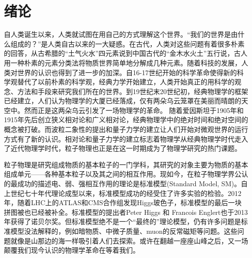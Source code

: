 

\setcounter{section}{0}



\chapter{绪论}

\setcounter{section}{0}

\setcounter{figure}{0}
\setcounter{table}{0}
\setcounter{equation}{0}

自人类诞生以来，人类就试图在用自己的方式理解这个世界。“我们的世界是由什么组成的？”是人类自古以来的一大疑惑。在古代，人类对这些问题有着很多朴素的回答，从古希腊的“土气火水”四元素说到中国古代的“金木水火土”五行说，古人用一种朴素的元素分类法将物质世界简单地分解成几种元素。随着科技的发展，人类对世界的认识也得到了进一步的加深。自16-17世纪开始的科学革命使得新的科学观替代了以前朴素的科学观，经典力学开始建立，人类开始真正的用科学的观念、方法和手段来研究我们所在的世界。到19世纪末20世纪初，经典物理学的框架已经建立，人们认为物理学的大厦已经落成，仅有两朵乌云笼罩在美丽而晴朗的天空中。然而正是这两朵乌云引发了一场物理学的革命。
随着爱因斯坦于1905年和1915年先后创立狭义相对论和广义相对论，经典物理学中的绝对时间和绝对空间的概念被打破。而波粒二象性的提出和量子力学的建立让人们开始对微观世界的运行方式有了新的认识。相对论和量子力学的建立标志着物理学从经典物理学时代走入了近代物理学时代，粒子物理也正是在这一时期成为了物理学研究的热门课题。

粒子物理是研究组成物质的基本粒子的一门学科，其研究的对象主要为物质的基本组成单元——各种基本粒子以及其之间的相互作用。现如今，在粒子物理学界公认的最成功的描述电、弱、强相互作用的理论是标准模型(Standard Model, SM)。自上世纪七十年代理论成型以来，标准模型成功的经受住了许多实验的检验。2012年，随着LHC上的ATLAS和CMS合作组发现Higgs玻色子，标准模型的最后一块拼图被也已经被补全。标准模型的提出者Peter Higgs 和 Francois Englert也于2013年获得了诺贝尔奖。但标准模型绝不是一个“最终的”理论模型，仍有许多问题是标准模型没法解释的，例如暗物质、中微子质量、muon的反常磁矩等问题。这些问题就像是山那边的海一样吸引着人们去探索。或许在翻越一座座山峰之后，又一场颠覆我们现今认识的物理学革命在等着我们。



% 










